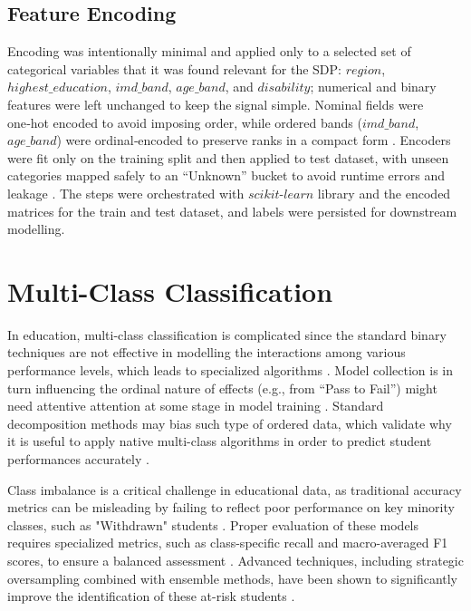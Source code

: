 \documentclass[ %
                    author={Carlos Duran Calle},
                supervisor={Dr. Felipe Campelo},
                    degree={MSc},
                     title={Comparative Machine Learning Analysis for Student Dropout Prediction in a Virtual Learning Environment},
                  subtitle={Incorporating Student Engagement and Socio-Economic Features},
                      type={},
                      year={2025}]{dissertation}
\begin{document}
\subsection{Feature Encoding}
Encoding was intentionally minimal and applied only to a selected set of categorical variables that it was found relevant for the SDP: $region$, $highest\_education$, $imd\_band$, $age\_band$, and $disability$; numerical and binary features were left unchanged to keep the signal simple. Nominal fields were one‑hot encoded to avoid imposing order, while ordered bands ($imd\_band$, $age\_band$) were ordinal‑encoded to preserve ranks in a compact form \cite{scikit_encoding}. Encoders were fit only on the training split and then applied to test dataset, with unseen categories mapped safely to an “Unknown” bucket to avoid runtime errors and leakage \cite{scikit_encoding}. The steps were orchestrated with $scikit‑learn$ library and the encoded matrices for the train and test dataset, and labels were persisted for downstream modelling.


\section{Multi-Class Classification}
In education, multi-class classification is complicated since the standard binary techniques are not effective in modelling the interactions among various performance levels, which leads to specialized algorithms \cite{fernandez_learning_2018}. Model collection is in turn influencing the ordinal nature of effects (e.g., from “Pass to Fail”) might need attentive attention at some stage in model training \cite{liu_exploratory_2009}. Standard decomposition methods may bias such type of ordered data, which validate why it is useful to apply native multi-class algorithms in order to predict student performances accurately \cite{krawczyk_learning_2016}.

Class imbalance is a critical challenge in educational data, as traditional accuracy metrics can be misleading by failing to reflect poor performance on key minority classes, such as "Withdrawn" students \cite{haixiang_learning_2017}. Proper evaluation of these models requires specialized metrics, such as class-specific recall and macro-averaged F1 scores, to ensure a balanced assessment \cite{luque_impact_2019}. Advanced techniques, including strategic oversampling combined with ensemble methods, have been shown to significantly improve the identification of these at-risk students \cite{galar_review_2012}.
\end{document}
